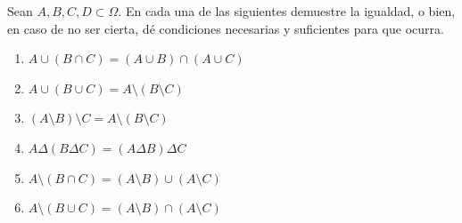 \documentclass[12pt,a4paper]{article}
\begin{document}
    \begin{mdframed}[style=mdbluebox,frametitle={Ejercicio 3}]
        Sean $A, B, C, D \subset \Omega$. En cada una de las siguientes demuestre la igualdad, o bien, en caso de no ser cierta, dé condiciones necesarias y suficientes para que ocurra.
        \begin{enumerate}[label=(\alph*)]
            \item $A \cup (B \cap C) = (A \cup B) \cap (A \cup C)$
            \item $A \cup (B \cup C) = A \setminus (B \setminus C)$
            \item $(A \setminus B) \setminus C = A \setminus (B \setminus C)$
            \item $A \Delta (B \Delta C) = (A \Delta B) \Delta C$
            \item $A \setminus (B \cap C) = (A \setminus B) \cup (A \setminus C)$
            \item $A \setminus (B \cup C) = (A \setminus B) \cap (A \setminus C)$
        \end{enumerate}
    \end{mdframed}
\end{document}
